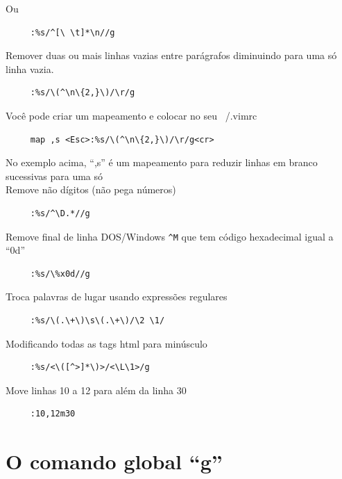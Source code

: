 \documentclass[10pt,a4paper,openany]{book}
\begin{document}
Ou

\begin{verbatim}
     :%s/^[\ \t]*\n//g
\end{verbatim}

Remover duas ou mais linhas vazias entre parágrafos diminuindo para
uma só linha vazia.

\begin{verbatim}
     :%s/\(^\n\{2,}\)/\r/g
\end{verbatim}

Você pode criar um mapeamento e colocar no seu ~/.vimrc

\begin{verbatim}
     map ,s <Esc>:%s/\(^\n\{2,}\)/\r/g<cr>
\end{verbatim}

No exemplo acima, ``,s'' é um mapeamento para reduzir linhas em branco
sucessivas para uma só  \\


Remove não dígitos (não pega números)

\begin{verbatim}
     :%s/^\D.*//g
\end{verbatim}

Remove final de linha DOS/Windows \verb|^M| que tem código hexadecimal igual a
``0d''

\begin{verbatim}
     :%s/\%x0d//g
\end{verbatim}

Troca palavras de lugar usando expressões regulares

\begin{verbatim}
     :%s/\(.\+\)\s\(.\+\)/\2 \1/
\end{verbatim}

Modificando todas as tags html para minúsculo

\begin{verbatim}
     :%s/<\([^>]*\)>/<\L\1>/g
\end{verbatim}

Move linhas 10 a 12 para além da linha 30

\begin{verbatim}
     :10,12m30
\end{verbatim}

\section{O comando global ``g''}\label{sec:O comando global ``g''}
\end{document}
